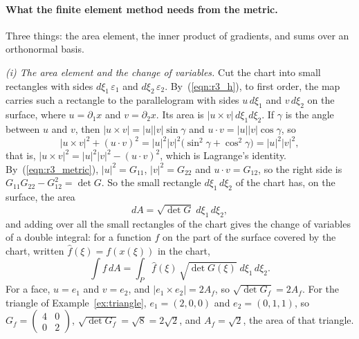 \paragraph{What the finite element method needs from the metric.} Three things: the area element, the inner product of gradients, and sums over an orthonormal basis.

\emph{(i) The area element and the change of variables.} Cut the chart into small rectangles with sides $d\xi_1\,\varepsilon_1$ and $d\xi_2\,\varepsilon_2$. By~(\ref{eqn:r3_h}), to first order, the map carries such a rectangle to the parallelogram with sides $u\, d\xi_1$ and $v\, d\xi_2$ on the surface, where $u = \partial_1 x$ and $v = \partial_2 x$. Its area is $|u\times v|\, d\xi_1 d\xi_2$. If $\gamma$ is the angle between $u$ and $v$, then $|u\times v| = |u||v|\sin\gamma$ and $u\cdot v = |u||v|\cos\gamma$, so
\begin{equation*}
|u\times v|^2 + (u\cdot v)^2 = |u|^2|v|^2\big(\sin^2\gamma + \cos^2\gamma\big) = |u|^2|v|^2 ,
\end{equation*}
that is, $|u\times v|^2 = |u|^2|v|^2 - (u\cdot v)^2$,
which is Lagrange's identity. By~(\ref{eqn:r3_metric}), $|u|^2 = G_{11}$, $|v|^2 = G_{22}$ and $u\cdot v = G_{12}$, so the right side is $G_{11}G_{22} - G_{12}^2 = \det G$. So the small rectangle $d\xi_1\, d\xi_2$ of the chart has, on the surface, the area
\begin{equation}
\label{eqn:r3_area}
dA = \sqrt{\det G}\; d\xi_1\, d\xi_2 ,
\end{equation}
and adding over all the small rectangles of the chart gives the change of variables of a double integral: for a function $f$ on the part of the surface covered by the chart, written $\hat f(\xi) = f(x(\xi))$ in the chart,
\begin{equation}
\label{eqn:s3a_change}
\int f\, dA = \int_P \hat f(\xi)\, \sqrt{\det G(\xi)}\; d\xi_1\, d\xi_2 .
\end{equation}
For a face, $u = e_1$ and $v = e_2$, and $|e_1\times e_2| = 2A_f$, so $\sqrt{\det G_f} = 2A_f$. For the triangle of Example~\ref{ex:triangle}, $e_1 = (2, 0, 0)$ and $e_2 = (0, 1, 1)$, so $G_f = \left(\begin{smallmatrix} 4 & 0 \\ 0 & 2 \end{smallmatrix}\right)$, $\sqrt{\det G_f} = \sqrt 8 = 2\sqrt 2$, and $A_f = \sqrt 2$, the area of that triangle.

